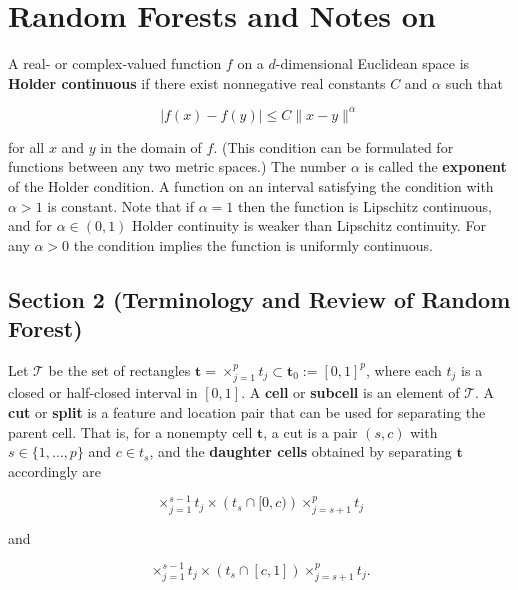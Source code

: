 %
%
%
%
%
%
%
%

\section{Random Forests and Notes on \citet{Chi2020}}

\begin{definition}

A real- or complex-valued function \(f\) on a \(d\)-dimensional Euclidean space is \textbf{Holder continuous} if there exist nonnegative real constants \(C\) and \(\alpha\) such that 

\[
|f(x) - f(y)| \leq C \lVert x - y \rVert^\alpha 
\]

for all \(x\) and \(y\) in the domain of \(f\). (This condition can be formulated for functions between any two metric spaces.) The number \(\alpha\) is called the \textbf{exponent} of the Holder condition. A function on an interval satisfying the condition with \(\alpha > 1\) is constant. Note that if \(\alpha =1\) then the function is Lipschitz continuous, and for \(\alpha \in (0,1)\) Holder continuity is weaker than Lipschitz continuity. For any \(\alpha > 0\) the condition implies the function is uniformly continuous. 

\end{definition}

\subsection{Section 2 (Terminology and Review of Random Forest)}

\begin{definition}

Let \(\mathcal{T}\) be the set of rectangles \(\boldsymbol{t} = \times_{j=1}^p t_j \subset \boldsymbol{t}_0 := [0,1]^p\), where each \(t_j\) is a closed or half-closed interval in \([0,1]\). A \textbf{cell} or \textbf{subcell} is an element of \(\mathcal{T}\). A \textbf{cut} or \textbf{split} is a feature and location pair that can be used for separating the parent cell. That is, for a nonempty cell \(\boldsymbol{t}\), a cut is a pair \((s,c)\) with \(s \in \{1, \ldots, p\}\) and \(c \in t_s\), and the \textbf{daughter cells} obtained by separating \(\boldsymbol{t}\) accordingly are

\[
\times_{j=1}^{s-1} t_j \times \left( t_s \cap [0, c) \right) \times_{j=s+1}^p t_j
\]

and

\[
\times_{j=1}^{s-1} t_j \times \left( t_s \cap [c, 1] \right) \times_{j=s+1}^p t_j.
\]

\end{definition}

